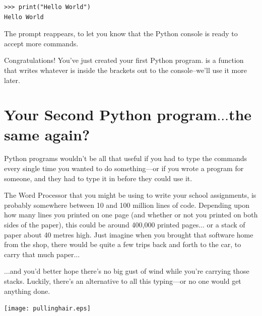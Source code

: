 \begin{listing}
\begin{verbatim}
>>> print("Hello World")
Hello World
\end{verbatim}
\end{listing}

The prompt reappears, to let you know that the Python console is ready to accept more commands.

\noindent
Congratulations! You've just created your first Python program.   is a function that writes whatever is inside the brackets out to the console--we'll use it more later.

\section{Your Second Python program$\ldots$the same again?}

Python programs wouldn't be all that useful if you had to type the commands every single time you wanted to do something---or if you wrote a program for someone, and they had to type it in before they could use it.

The Word Processor that you might be using to write your school assignments, is probably somewhere between 10 and 100 million lines of code.  Depending upon how many lines you printed on one page (and whether or not you printed on both sides of the paper), this could be around 400,000 printed pages$\ldots$ or a stack of paper about 40 metres high.
Just imagine when you brought that software home from the shop, there would be quite a few trips back and forth to the car, to carry that much paper$\ldots$

$\ldots$and you'd better hope there's no big gust of wind while you're carrying those stacks. Luckily, there's an alternative to all this typing---or no one would get anything done.

\begin{center}
\texttt{[image: pullinghair.eps]}
\end{center}

